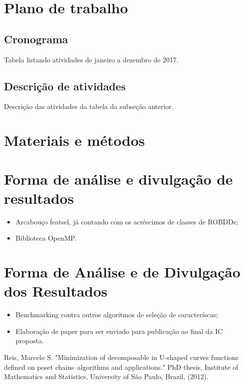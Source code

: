 \documentclass[12pt]{article}
\begin{document}
\section{Plano de trabalho}

\subsection{Cronograma}

Tabela listando atividades de janeiro a dezembro de 2017.

\subsection{Descrição de atividades}

Descrição das atividades da tabela da subseção anterior.

\section{Materiais e métodos}

\section{Forma de análise e divulgação de resultados}

\begin{itemize}
\item Arcabouço featsel, já contando com os acréscimos de classes de ROBDDs;

\item Biblioteca OpenMP.
\end{itemize}

\section{Forma de Análise e de Divulgação dos Resultados}

\begin{itemize}
\item Benchmarking contra outros algoritmos de seleção de caracteríscas;

\item Elaboração de paper para ser enviado para publicação ao final da IC proposta.
\end{itemize}

\newpage
\begin{thebibliography}{}
    Reis, Marcelo S. "Minimization of decomposable in U-shaped curves 
    functions defined on poset chains–algorithms and applications."
    PhD thesis, Institute of Mathematics and Statistics, University of
    São Paulo, Brazil, (2012).
\end{thebibliography}
\end{document}
